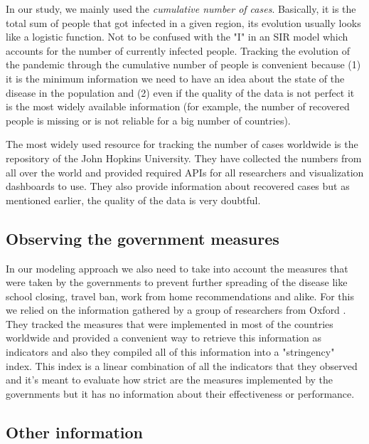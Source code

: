 \documentclass[12pt, letterpaper]{article}
\begin{document}
In our study, we mainly used the {\em cumulative number of cases}. 
Basically, it is the total sum of people that got infected in a given region, its evolution usually looks like a logistic function. 
Not to be confused with the "I" in an SIR model which accounts for the number of currently infected people. 
Tracking the evolution of the pandemic through the cumulative number of people is convenient because (1) it is the minimum information we need to have an idea about the state of the disease in the population and (2) even if the quality of the data is not perfect it is the most widely available information (for example, the number of recovered people is missing or is not reliable for a big number of countries).

The most widely used resource for tracking the number of cases worldwide is the repository of the John Hopkins University. They have collected the numbers from all over the world and provided required APIs for all researchers and visualization dashboards to use. They also provide information about recovered cases but as mentioned earlier, the quality of the data is very doubtful.

\subsection{Observing the government measures}\label{sec:stringency}

In our modeling approach we also need to take into account the measures that were taken by the governments to prevent further spreading of the disease like school closing, travel ban, work from home recommendations and alike. 
For this we relied on the information gathered by a group of researchers from Oxford \cite{ox}. 
They tracked the measures that were implemented in most of the countries worldwide and provided a convenient way to retrieve this information as indicators and also they compiled all of this information into a "stringency" index. 
This index is a linear combination of all the indicators that they observed and it's meant to evaluate how strict are the measures implemented by the governments but it has no information about their effectiveness or performance.

\subsection{Other information}\label{sec:worldbank}
\end{document}
